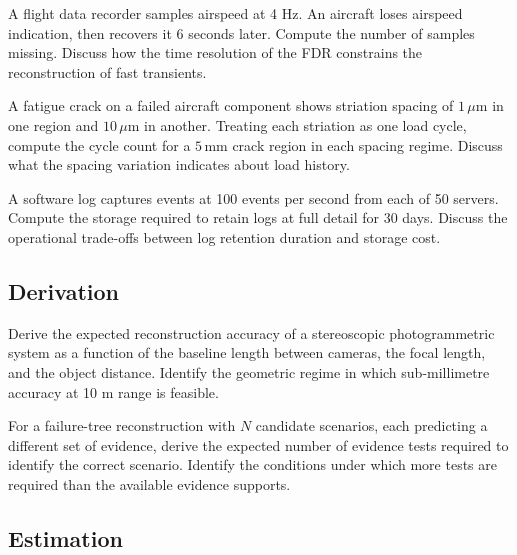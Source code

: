 \begin{exercise}
A flight data recorder samples airspeed at 4 Hz. An aircraft loses airspeed indication, then recovers it 6 seconds later. Compute the number of samples missing. Discuss how the time resolution of the FDR constrains the reconstruction of fast transients.
\end{exercise}

\begin{exercise}
A fatigue crack on a failed aircraft component shows striation spacing of $1\,\mu\text{m}$ in one region and $10\,\mu\text{m}$ in another. Treating each striation as one load cycle, compute the cycle count for a $5\,\text{mm}$ crack region in each spacing regime. Discuss what the spacing variation indicates about load history.
\end{exercise}

\begin{exercise}
A software log captures events at 100 events per second from each of 50 servers. Compute the storage required to retain logs at full detail for 30 days. Discuss the operational trade-offs between log retention duration and storage cost.
\end{exercise}

\subsection*{Derivation}

\begin{exercise}
Derive the expected reconstruction accuracy of a stereoscopic photogrammetric system as a function of the baseline length between cameras, the focal length, and the object distance. Identify the geometric regime in which sub-millimetre accuracy at 10 m range is feasible.
\end{exercise}

\begin{exercise}
For a failure-tree reconstruction with $N$ candidate scenarios, each predicting a different set of evidence, derive the expected number of evidence tests required to identify the correct scenario. Identify the conditions under which more tests are required than the available evidence supports.
\end{exercise}

\subsection*{Estimation}


